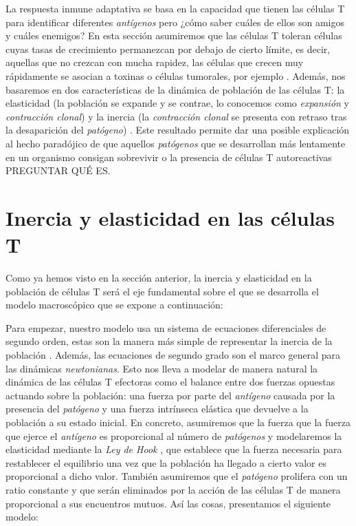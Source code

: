 La respuesta inmune adaptativa se basa en la capacidad que tienen las células T para identificar diferentes \textit{antígenos} pero ¿cómo saber cuáles de ellos son amigos y cuáles enemigos? En esta sección asumiremos que las células T toleran células cuyas tasas de crecimiento permanezcan por debajo de cierto límite, es decir, aquellas que no crezcan con mucha rapidez, las células que crecen muy rápidamente se asocian a toxinas o células tumorales, por ejemplo \citep{arias2015growth}. Además, nos basaremos en dos características de la dinámica de población de las células T: la elasticidad (la población se expande y se contrae, lo conocemos como \textit{expansión} y \textit{contracción clonal}) y la inercia (la \textit{contracción clonal} se presenta con retraso tras la desaparición del \textit{patógeno}) \citep{arias2015growth}. Este resultado permite dar una posible explicación al hecho paradójico de que aquellos \textit{patógenos} que se desarrollan más lentamente en un organismo consigan sobrevivir o la presencia de células T autoreactivas PREGUNTAR QUÉ ES.


\section{Inercia y elasticidad en las células T}

Como ya hemos visto en la sección anterior, la inercia y elasticidad en la población de células T será el eje fundamental sobre el que se desarrolla el modelo macroscópico que se expone a continuación: 

Para empezar, nuestro modelo usa un sistema de ecuaciones diferenciales de segundo orden, estas son la manera más simple de representar la inercia de la población \citep{arias2015growth}. Además, las ecuaciones de segundo grado son el marco general para las dinámicas \textit{newtonianas}. Esto nos lleva a modelar de manera natural la dinámica de las células T efectoras como el balance entre dos fuerzas opuestas actuando sobre la población: una fuerza por parte del \textit{antígeno} causada por la presencia del \textit{patógeno} y una fuerza intrínseca elástica que devuelve a la población a su estado inicial. En concreto, asumiremos que la fuerza que la fuerza que ejerce el \textit{antígeno} es proporcional al número de \textit{patógenos} y modelaremos la elasticidad mediante la \textit{Ley de Hook} \citep{arias2015growth}, que establece que la fuerza necesaria para restablecer el equilibrio una vez que la población ha llegado a cierto valor es proporcional a dicho valor. También asumiremos que el \textit{patógeno} prolifera con un ratio constante y que serán eliminados por la acción de las células T de manera proporcional a sus encuentros mutuos. Así las cosas, presentamos el siguiente modelo:

